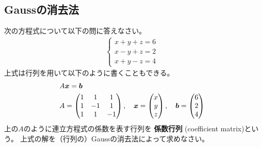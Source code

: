 \documentclass[twocolumn,11pt]{jarticle}
\begin{document}
\subsection{Gaussの消去法}
次の方程式について以下の問に答えなさい。
\begin{align}
  \begin{cases}
    x+y+z=6\\
    x-y+z=2\\
    x+y-z=4
  \end{cases}\label{eq:hakidashi}
\end{align}
上式は行列を用いて以下のように書くこともできる。
\begin{align}
  &A\boldsymbol{x}=\boldsymbol{b}\notag\\
  &A=
  \begin{pmatrix}
    1 & 1 & 1  \\
    1 & -1 & 1 \\
    1 & 1 & -1
  \end{pmatrix},\quad
  \boldsymbol{x}=
  \begin{pmatrix}
    x\\
    y\\
    z
  \end{pmatrix},\quad
  \boldsymbol{b}=
  \begin{pmatrix}
    6\\ 2\\ 4
  \end{pmatrix}\notag
\end{align}
上の$A$のように連立方程式の係数を表す行列を
\textbf{係数行列}
(coefficient matrix)という。
上式の解を（行列の）Gaussの消去法によって求めなさい。
\end{document}
